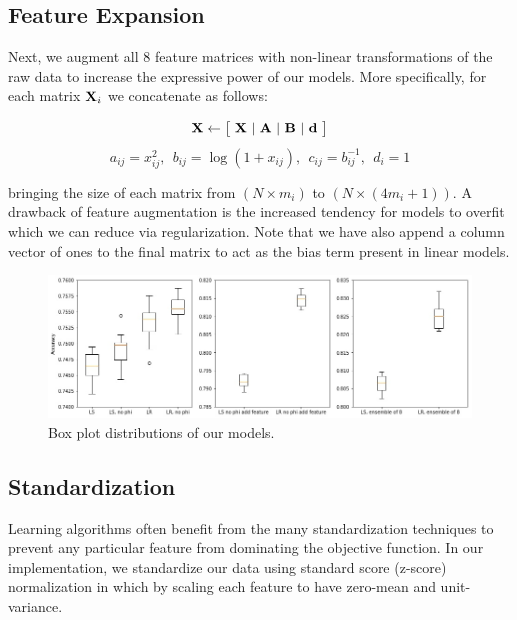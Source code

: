 \documentclass[10pt,conference,compsocconf]{IEEEtran}
\begin{document}
\subsection{Feature Expansion}
Next, we augment all 8 feature matrices with non-linear transformations of the raw data to increase the expressive power of our models. More specifically, for each matrix ${\textbf X_i}$ we concatenate as follows:

\begin{equation}
{\textbf X} \leftarrow \big[ \ {\textbf X} \ \vert \ {\textbf A} \ \vert \ {\textbf B} \ \vert \ {\textbf d} \ \big]
\end{equation}
\vspace*{-5mm}
\begin{equation}
a_{ij} = x_{ij}^2, \ \ b_{ij} = \log (1 + x_{ij}), \ \ c_{ij} = b_{ij}^{-1}, \ \ d_{i} = 1 
\end{equation}

bringing the size of each matrix from $ (N \times m_i) $ to $ (N \times (4m_i + 1))$. A drawback of feature augmentation is the increased tendency for models to overfit which we can reduce via regularization. Note that we have also append a column vector of ones to the final matrix to act as the bias term present in linear models. 

\begin{figure}[t]
\begin{center}
  \includegraphics[width=\textwidth]{box1.jpg}
  \caption{Box plot distributions of our models.}
\end{center}
   \label{fig:boxplot}
\end{figure}

\subsection{Standardization}
Learning algorithms often benefit from the many standardization techniques to prevent any particular feature from dominating the objective function. In our implementation, we standardize our data using standard score (z-score) normalization in which by scaling each feature to have zero-mean and unit-variance.
\end{document}
